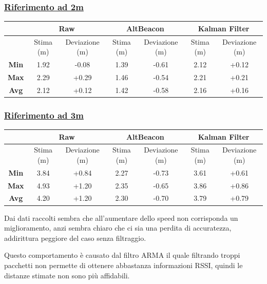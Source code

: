 \subsubsection{\underline{Riferimento ad 2m}}
\begin{center}
	\begin{tabular}{|c|c|c|c|c|c|c|}
		\hline 
		& \multicolumn{2}{|c|}{\textbf{Raw}} &\multicolumn{2}{|c|}{\textbf{AltBeacon}} &\multicolumn{2}{|c|}{\textbf{Kalman Filter}}\\ 
		\hline 
		& Stima (m) & Deviazione (m) & Stima (m) & Deviazione (m) & Stima (m)& Deviazione (m)\\ 
		\hline 
		\textbf{Min} & 1.92	& -0.08 & 1.39	& -0.61 & 2.12	& +0.12 \\ 
		\hline 
		\textbf{Max} & 2.29	& +0.29 & 1.46	& -0.54 & 2.21	& +0.21	\\ 
		\hline 
		\textbf{Avg} & 2.12	& +0.12 & 1.42 	& -0.58 & 2.16 	& +0.16	\\ 
		\hline 
	\end{tabular}
\end{center}

\subsubsection{\underline{Riferimento ad 3m}}
\begin{center}
	\begin{tabular}{|c|c|c|c|c|c|c|}
		\hline 
		& \multicolumn{2}{|c|}{\textbf{Raw}} &\multicolumn{2}{|c|}{\textbf{AltBeacon}} &\multicolumn{2}{|c|}{\textbf{Kalman Filter}}\\ 
		\hline 
		& Stima (m) & Deviazione (m) & Stima (m) & Deviazione (m) & Stima (m)& Deviazione (m)\\ 
		\hline 
		\textbf{Min} & 3.84	& +0.84 & 2.27	& -0.73 & 3.61	& +0.61 \\ 
		\hline 
		\textbf{Max} & 4.93	& +1.20 & 2.35	& -0.65 & 3.86	& +0.86	\\ 
		\hline 
		\textbf{Avg} & 4.20	& +1.20 & 2.30 	& -0.70 & 3.79 	& +0.79	\\ 
		\hline 
	\end{tabular}
\end{center}

Dai dati raccolti sembra che all'aumentare dello speed non corrisponda un miglioramento, anzi sembra chiaro che ci sia una perdita di accuratezza, addirittura peggiore del caso senza filtraggio.

Questo comportamento è causato dal filtro ARMA il quale filtrando troppi pacchetti non permette di ottenere abbastanza informazioni RSSI, quindi le distanze stimate non sono più affidabili.


